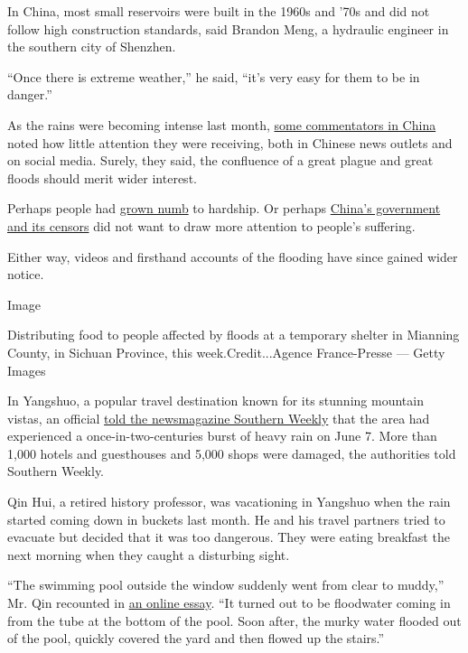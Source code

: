 In China, most small reservoirs were built in the 1960s and '70s and did
not follow high construction standards, said Brandon Meng, a hydraulic
engineer in the southern city of Shenzhen.

``Once there is extreme weather,'' he said, ``it's very easy for them to
be in danger.''

As the rains were becoming intense last month,
\href{https://mp.weixin.qq.com/s?__biz=MjM5NzQwNjcyMQ==\&mid=2651038705\&idx=1\&sn=869571fbb6b9f41381c32e8b6d008d01\&chksm=bd2d729f8a5afb89876d8a3e72274b92cfc357392dd18ca3e9d67ce893e6eec47d988bd82c9e\&scene=4}{some
commentators in China} noted how little attention they were receiving,
both in Chinese news outlets and on social media. Surely, they said, the
confluence of a great plague and great floods should merit wider
interest.

Perhaps people had
\href{https://www.weibo.com/1463665055/J9kyy49Fe?refer_flag=1001030103_\&type=comment}{grown
numb} to hardship. Or perhaps
\href{https://theinitium.com/article/2020629-mainland-invisible-flood/?utm_medium=copy}{China's
government and its censors} did not want to draw more attention to
people's suffering.

Either way, videos and firsthand accounts of the flooding have since
gained wider notice.

Image

Distributing food to people affected by floods at a temporary shelter in
Mianning County, in Sichuan Province, this week.Credit...Agence
France-Presse --- Getty Images

In Yangshuo, a popular travel destination known for its stunning
mountain vistas, an official
\href{https://www.infzm.com/contents/186093}{told the newsmagazine
Southern Weekly} that the area had experienced a once-in-two-centuries
burst of heavy rain on June 7. More than 1,000 hotels and guesthouses
and 5,000 shops were damaged, the authorities told Southern Weekly.

Qin Hui, a retired history professor, was vacationing in Yangshuo when
the rain started coming down in buckets last month. He and his travel
partners tried to evacuate but decided that it was too dangerous. They
were eating breakfast the next morning when they caught a disturbing
sight.

``The swimming pool outside the window suddenly went from clear to
muddy,'' Mr. Qin recounted in
\href{http://qinhui.blog.caixin.com/archives/230173}{an online essay}.
``It turned out to be floodwater coming in from the tube at the bottom
of the pool. Soon after, the murky water flooded out of the pool,
quickly covered the yard and then flowed up the stairs.''

